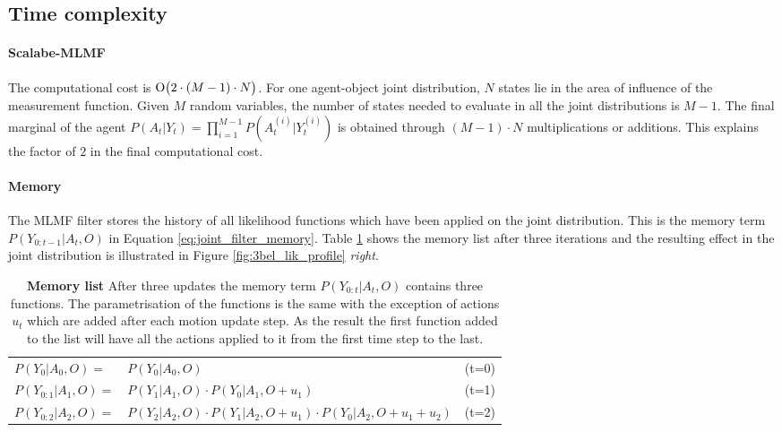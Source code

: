\documentclass[review]{elsarticle}
\numberwithin{equation}{section}
\begin{document}
\subsection{Time complexity}

\paragraph{Scalabe-MLMF} The computational cost is $\operatorname{O}\bigl(2 \cdot \left(M - 1\right) \cdot N \bigr)$. For one agent-object joint distribution, $N$
states lie in the area of influence of the measurement function. Given $M$ random variables, the number of states needed to evaluate in all the joint distributions
is $M-1$. The final marginal of the agent $P(A_t|Y_t) = \prod\limits_{i=1}^{M-1} P(A^{(i)}_t|Y^{(i)}_t)$ is obtained through $(M-1)\cdot N$ multiplications or additions.
This explains the factor of $2$ in the final computational cost.

\paragraph{Memory}\label{appendix:memory_time_complexity}

The MLMF filter stores the history of all likelihood functions which have been applied on the joint distribution. This is the 
memory term $P(Y_{0:t-1}|A_t,O)$ in Equation \ref{eq:joint_filter_memory}. Table \ref{tab:memory_list} shows the memory list after three 
iterations and the resulting effect in  the joint distribution is illustrated in Figure \ref{fig:3bel_lik_profile} \textit{right}.

\begin{table}
\begin{center}
 \begin{tabular}{llc}
 $P(Y_{0 }|A_0,O)  = $  & $P(Y_0|A_0,O)$				                            & (t=0) \\
 $P(Y_{0:1}|A_1,O) = $  & $P(Y_1|A_1,O) \cdot P(Y_0|A_1,O+u_1)$                             & (t=1) \\
 $P(Y_{0:2}|A_2,O) = $  & $P(Y_2|A_2,O) \cdot P(Y_1|A_2,O+u_1) \cdot P(Y_0|A_2,O+u_1+u_2)$  & (t=2)
\end{tabular}
\end{center}
\caption{\textbf{Memory list} After three updates the memory term $P(Y_{0:t}|A_t,O)$ contains three functions. The parametrisation
of the functions is the same with the exception of actions $u_t$ which are added after each motion update step. As the result the 
first function added to the list will have all the actions applied to it from the first time step to the last.}
\label{tab:memory_list}
\end{table}
\end{document}
